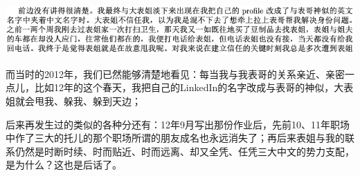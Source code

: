 \documentclass[9pt, b5paper]{article}
\begin{document}
\begin{center}
\includegraphics[width=.9\linewidth]{./pic/backups_plans_20210413_135837.png}
\end{center}

而当时的2012年，我们已然能够清楚地看见：每当我与我表哥的关系亲近、亲密一点儿，比如12年的这个春天，我把自己的LinkedIn的名字改成与表哥的神似，大表姐就会甩我、躲我、躲到天边；

后来再发生过的类似的各种分还有：12年9月写出那份作业后，先前10、11年职场中作了三大的托儿的那个职场所谓的朋友成名也永远消失了；再后来表姐与我的联系仍然是时断时续、时而贴近、时而远离、却又全凭、任凭三大中文的势力支配，是为什么？这也是后话了。 
\end{document}
